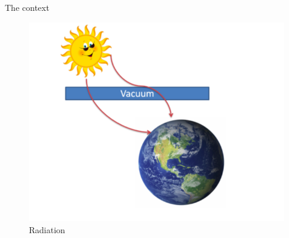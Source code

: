 \begin{frame}[allowframebreaks]{The context}
\begin{minipage}{0.35\linewidth}
\begin{figure}
        \includegraphics[width=1.2\linewidth]{images/enkf/radiation.png}
        \caption{Radiation}
    \end{figure}
\end{minipage}

\end{frame}
